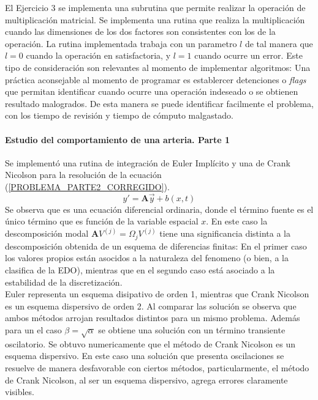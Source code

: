 \documentclass[letterpaper]{article}
\newcommand{\vect}[1]{\boldsymbol{#1}} %
\begin{document}
El Ejercicio 3 se implementa una subrutina que permite realizar la operación de multiplicación matricial. Se implementa una rutina que realiza la multiplicación cuando las dimensiones de los dos factores son consistentes con los de la operación. La rutina implementada trabaja con un parametro $l$ de tal manera que $l=0$ cuando la operación en satisfactoria, y $l=1$ cuando ocurre un error. Este tipo de consideración son relevantes al momento de implementar algoritmos: Una práctica aconsejable al momento de programar es establercer detenciones o \textit{flags} que permitan identificar cuando ocurre una operación indeseado o se obtienen resultado malogrados. De esta manera se puede identificar facilmente el problema, con los tiempo de revisión y tiempo de cómputo malgastado. \\

\paragraph{Estudio del comportamiento de una arteria. Parte 1} 
Se implementó una rutina de integración de Euler Implícito y una de Crank Nicolson para la resolución de la ecuación (\ref{PROBLEMA_PARTE2_CORREGIDO}).
$$ {y}' = \vect{A} \vec{y} + b(x,t)$$
 Se observa que es una ecuación diferencial ordinaria, donde el término fuente es el único término que es función de la variable espacial $x$. En este caso la descomposición modal $\vect{A} V^{(j)} = \Omega_j V^{(j)}$ tiene una significancia distinta a la descomposición obtenida de un esquema de diferencias finitas: En el primer caso los valores propios están asocidos a la naturaleza del fenomeno (o bien, a la clasifica de la EDO), mientras que en el segundo caso está asociado a la estabilidad de la discretización. \\
 
Euler representa un esquema disipativo de orden 1, mientras que Crank Nicolson es un esquema dispersivo de orden 2. Al comparar las solución se observa que ambos métodos arrojan resultados distintos para un mismo problema. Además para un el caso $\beta=\sqrt{\alpha}$ se obtiene una solución con un término transiente oscilatorio. Se obtuvo numericamente que el método de Crank Nicolson es un esquema dispersivo. En este caso una solución que presenta oscilaciones se resuelve de manera desfavorable con ciertos métodos, particularmente, el método de Crank Nicolson, al ser un esquema dispersivo, agrega errores claramente visibles.
\end{document}
